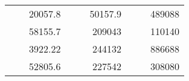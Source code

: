 \begin{table}[H]
\begin{tabular}{|ccrccrccc}
\rowcolor[HTML]{DDFDFF} 
\multicolumn{1}{|c|}{\cellcolor[HTML]{FFFFC7}}                                & \multicolumn{1}{c|}{\cellcolor[HTML]{DDFDFF}}                      & \multicolumn{1}{r|}{\cellcolor[HTML]{DAE8FC}20057.8}   & \multicolumn{1}{c|}{\cellcolor[HTML]{FFFFC7}}                                & \multicolumn{1}{c|}{\cellcolor[HTML]{DDFDFF}}                       & \multicolumn{1}{r|}{\cellcolor[HTML]{DDFDFF}50157.9}   & \multicolumn{1}{c|}{\cellcolor[HTML]{FFFFC7}}                                & \multicolumn{1}{c|}{\cellcolor[HTML]{DDFDFF}}                      & \multicolumn{1}{r|}{\cellcolor[HTML]{DDFDFF}489088}    \\ \cline{3-3} \cline{6-6} \cline{9-9} 
\multicolumn{1}{|c|}{\cellcolor[HTML]{FFFFC7}}                                & \multicolumn{1}{c|}{\cellcolor[HTML]{DDFDFF}}                      & \multicolumn{1}{r|}{\cellcolor[HTML]{DDFDFF}58155.7}   & \multicolumn{1}{c|}{\cellcolor[HTML]{FFFFC7}}                                & \multicolumn{1}{c|}{\cellcolor[HTML]{DDFDFF}}                       & \multicolumn{1}{r|}{\cellcolor[HTML]{DAE8FC}209043}    & \multicolumn{1}{c|}{\cellcolor[HTML]{FFFFC7}}                                & \multicolumn{1}{c|}{\cellcolor[HTML]{DDFDFF}}                      & \multicolumn{1}{r|}{\cellcolor[HTML]{DAE8FC}110140}    \\ \cline{3-3} \cline{6-6} \cline{9-9} 
\rowcolor[HTML]{DDFDFF} 
\multicolumn{1}{|c|}{\cellcolor[HTML]{FFFFC7}}                                & \multicolumn{1}{c|}{\cellcolor[HTML]{DDFDFF}}                      & \multicolumn{1}{r|}{\cellcolor[HTML]{DAE8FC}3922.22}   & \multicolumn{1}{c|}{\cellcolor[HTML]{FFFFC7}}                                & \multicolumn{1}{c|}{\cellcolor[HTML]{DDFDFF}}                       & \multicolumn{1}{r|}{\cellcolor[HTML]{DDFDFF}244132}    & \multicolumn{1}{c|}{\cellcolor[HTML]{FFFFC7}}                                & \multicolumn{1}{c|}{\cellcolor[HTML]{DDFDFF}}                      & \multicolumn{1}{r|}{\cellcolor[HTML]{DDFDFF}886688}    \\ \cline{3-3} \cline{6-6} \cline{9-9} 
\multicolumn{1}{|c|}{\cellcolor[HTML]{FFFFC7}}                                & \multicolumn{1}{c|}{\cellcolor[HTML]{DDFDFF}}                      & \multicolumn{1}{r|}{\cellcolor[HTML]{DDFDFF}52805.6}   & \multicolumn{1}{c|}{\cellcolor[HTML]{FFFFC7}}                                & \multicolumn{1}{c|}{\cellcolor[HTML]{DDFDFF}}                       & \multicolumn{1}{r|}{\cellcolor[HTML]{DAE8FC}227542}    & \multicolumn{1}{c|}{\cellcolor[HTML]{FFFFC7}}                                & \multicolumn{1}{c|}{\cellcolor[HTML]{DDFDFF}}                      & \multicolumn{1}{r|}{\cellcolor[HTML]{DAE8FC}308080}    \\ \cline{3-3} \cline{6-6} \cline{9-9} 

\end{tabular}
\end{table}
